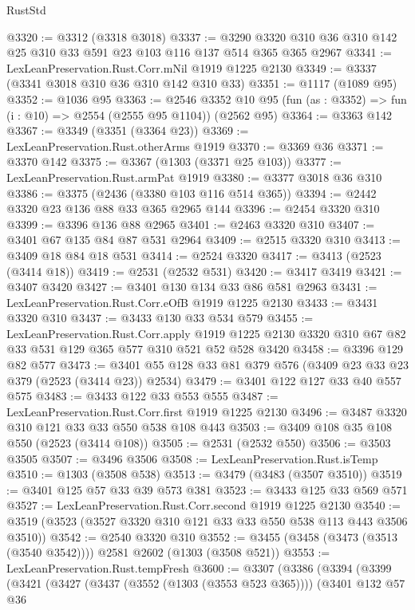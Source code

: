 \begin{lexlean}{RustStd}
\begin{coremodule}
@3320 := @3312 (@3318 @3018)
@3337 := @3290 @3320 @310 @36 @310 @142 @25 @310 @33 @591 @23 @103 @116 @137 @514 @365 @365 @2967
@3341 := LexLeanPreservation.Rust.Corr.mNil @1919 @1225 @2130
@3349 := @3337 (@3341 @3018 @310 @36 @310 @142 @310 @33)
@3351 := @1117 (@1089 @95)
@3352 := @1036 @95
@3363 := @2546
    @3352
    @10
    @95
    (fun (as : @3352) => fun (i : @10) => @2554 (@2555 @95 @1104))
    (@2562 @95)
@3364 := @3363 @142
@3367 := @3349 (@3351 (@3364 @23))
@3369 := LexLeanPreservation.Rust.otherArms @1919
@3370 := @3369 @36
@3371 := @3370 @142
@3375 := @3367 (@1303 (@3371 @25 @103))
@3377 := LexLeanPreservation.Rust.armPat @1919
@3380 := @3377 @3018 @36 @310
@3386 := @3375 (@2436 (@3380 @103 @116 @514 @365))
@3394 := @2442 @3320 @23 @136 @88 @33 @365 @2965 @144
@3396 := @2454 @3320 @310
@3399 := @3396 @136 @88 @2965
@3401 := @2463 @3320 @310
@3407 := @3401 @67 @135 @84 @87 @531 @2964
@3409 := @2515 @3320 @310
@3413 := @3409 @18 @84 @18 @531
@3414 := @2524 @3320
@3417 := @3413 (@2523 (@3414 @18))
@3419 := @2531 (@2532 @531)
@3420 := @3417 @3419
@3421 := @3407 @3420
@3427 := @3401 @130 @134 @33 @86 @581 @2963
@3431 := LexLeanPreservation.Rust.Corr.eOfB @1919 @1225 @2130
@3433 := @3431 @3320 @310
@3437 := @3433 @130 @33 @534 @579
@3455 := LexLeanPreservation.Rust.Corr.apply
    @1919
    @1225
    @2130
    @3320
    @310
    @67
    @82
    @33
    @531
    @129
    @365
    @577
    @310
    @521
    @52
    @528
    @3420
@3458 := @3396 @129 @82 @577
@3473 := @3401 @55 @128 @33 @81 @379 @576 (@3409 @23 @33 @23 @379 (@2523 (@3414 @23)) @2534)
@3479 := @3401 @122 @127 @33 @40 @557 @575
@3483 := @3433 @122 @33 @553 @555
@3487 := LexLeanPreservation.Rust.Corr.first @1919 @1225 @2130
@3496 := @3487 @3320 @310 @121 @33 @33 @550 @538 @108 @443
@3503 := @3409 @108 @35 @108 @550 (@2523 (@3414 @108))
@3505 := @2531 (@2532 @550)
@3506 := @3503 @3505
@3507 := @3496 @3506
@3508 := LexLeanPreservation.Rust.isTemp
@3510 := @1303 (@3508 @538)
@3513 := @3479 (@3483 (@3507 @3510))
@3519 := @3401 @125 @57 @33 @39 @573 @381
@3523 := @3433 @125 @33 @569 @571
@3527 := LexLeanPreservation.Rust.Corr.second @1919 @1225 @2130
@3540 := @3519 (@3523 (@3527 @3320 @310 @121 @33 @33 @550 @538 @113 @443 @3506 @3510))
@3542 := @2540 @3320 @310
@3552 := @3455 (@3458 (@3473 (@3513 (@3540 @3542)))) @2581 @2602 (@1303 (@3508 @521))
@3553 := LexLeanPreservation.Rust.tempFresh
@3600 := @3307
    (@3386
      (@3394
        (@3399
          (@3421
            (@3427
              (@3437 (@3552 (@1303 (@3553 @523 @365))))
              (@3401
                @132
                @57
                @36

\end{coremodule}
\end{lexlean}

